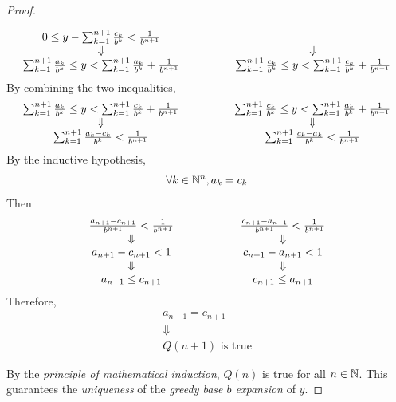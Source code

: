 \begin{proof}
\begin{itemize}
\[\begin{array}{c@{\qquad\quad\qquad}c}
            0 \leq y - \sum_{k = 1}^{n + 1} \frac{c_{k}}{b^{k}} < \frac{1}{b^{n + 1}} \\
            \Downarrow & \Downarrow \\
            \sum_{k = 1}^{n + 1} \frac{a_{k}}{b^{k}} \leq y <
            \sum_{k = 1}^{n + 1} \frac{a_{k}}{b^{k}} + \frac{1}{b^{n + 1}} &
            \sum_{k = 1}^{n + 1} \frac{c_{k}}{b^{k}} \leq y <
            \sum_{k = 1}^{n + 1} \frac{c_{k}}{b^{k}} + \frac{1}{b^{n + 1}}
        \end{array}
        \]
        By combining the two inequalities,
        \[
        \begin{array}{c@{\qquad\quad\qquad}c}
            \sum_{k = 1}^{n + 1} \frac{a_{k}}{b^{k}} \leq y <
            \sum_{k = 1}^{n + 1} \frac{c_{k}}{b^{k}} + \frac{1}{b^{n + 1}} &
            \sum_{k = 1}^{n + 1} \frac{c_{k}}{b^{k}} \leq y <
            \sum_{k = 1}^{n + 1} \frac{a_{k}}{b^{k}} + \frac{1}{b^{n + 1}} \\
            \Downarrow & \Downarrow \\
            \sum_{k = 1}^{n + 1} \frac{a_{k} - c_{k}}{b^{k}} < \frac{1}{b^{n + 1}} &
            \sum_{k = 1}^{n + 1} \frac{c_{k} - a_{k}}{b^{k}} < \frac{1}{b^{n + 1}}
        \end{array}
        \]
        By the inductive hypothesis,
        \[
        \forall k \in \mathbb{N}^{n}, a_{k} = c_{k}
        \]
        Then
        \[
        \begin{array}{c@{\qquad\qquad\qquad}c}
            \frac{a_{n + 1} - c_{n + 1}}{b^{n + 1}} < \frac{1}{b^{n + 1}} &
            \frac{c_{n + 1} - a_{n + 1}}{b^{n + 1}} < \frac{1}{b^{n + 1}} \\
            \Downarrow & \Downarrow \\
            a_{n + 1} - c_{n + 1} < 1 &
            c_{n + 1} - a_{n + 1} < 1 \\
            \Downarrow & \Downarrow \\
            a_{n + 1} \leq c_{n + 1} &
            c_{n + 1} \leq a_{n + 1}
        \end{array}
        \]
        Therefore,
        \[
        \begin{array}{c}
            a_{n + 1} = c_{n + 1} \\
            \Downarrow \\
            Q(n + 1) \text{ is true}
        \end{array}
        \]
    \end{itemize}
    By the \emph{principle of mathematical induction}, $Q(n)$ is true for all $n \in \mathbb{N}$.
    This guarantees the \emph{uniqueness} of the \emph{greedy base $b$ expansion} of $y$.
\end{proof}

